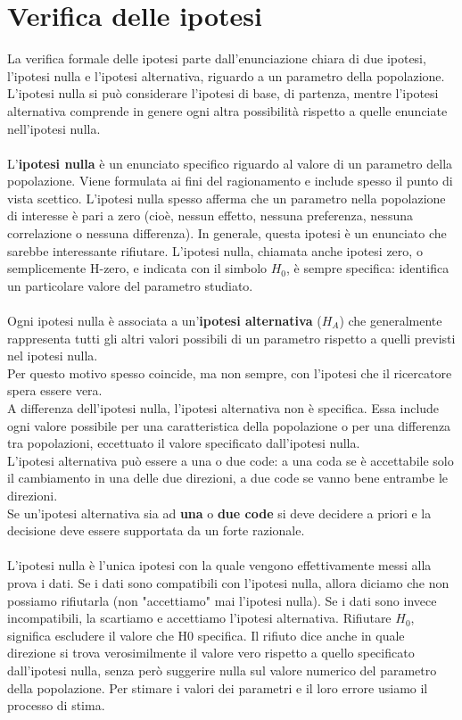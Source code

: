 \documentclass[10pt, draft]{book}
\begin{document}
\section{Verifica delle ipotesi}
La verifica formale delle ipotesi parte dall'enunciazione chiara di due ipotesi, l'ipotesi nulla e l'ipotesi alternativa, riguardo a un parametro della popolazione. L'ipotesi nulla si può considerare l'ipotesi di base, di partenza, mentre l'ipotesi alternativa comprende in genere ogni altra possibilità rispetto a quelle enunciate nell'ipotesi nulla. 
\\
\\
L'\textbf{ipotesi nulla} è un enunciato specifico riguardo al valore di un parametro della popolazione. Viene formulata ai fini del ragionamento e include spesso il punto di vista scettico. L'ipotesi nulla spesso afferma che un parametro nella popolazione di interesse è pari a zero (cioè, nessun effetto, nessuna preferenza, nessuna correlazione o nessuna differenza). In generale, questa ipotesi è un enunciato che sarebbe interessante rifiutare. L'ipotesi nulla, chiamata anche ipotesi zero, o semplicemente H-zero, e indicata con il simbolo $H_0$, è sempre specifica: identifica un particolare valore del parametro studiato. 
\\
\\
Ogni ipotesi nulla è associata a un'\textbf{ipotesi alternativa} ($H_A$) che generalmente rappresenta tutti gli altri valori possibili di un parametro rispetto a quelli previsti nel ipotesi nulla.
\\
Per questo motivo spesso coincide, ma non sempre, con l'ipotesi che il ricercatore spera essere vera.
\\
A differenza dell'ipotesi nulla, l'ipotesi alternativa non è specifica. Essa include ogni valore possibile per una caratteristica della popolazione o per una differenza tra popolazioni, eccettuato il valore specificato dall'ipotesi nulla.
\\
L’ipotesi alternativa può essere a una o due code: a una coda se è accettabile solo il cambiamento in una delle due direzioni, a due code se vanno bene entrambe le direzioni.
\\
Se un’ipotesi alternativa sia ad \textbf{una} o \textbf{due code} si deve decidere a priori e la decisione deve essere supportata da un forte razionale.
\\
\\
L'ipotesi nulla è l'unica ipotesi con la quale vengono effettivamente messi alla prova i dati. Se i dati sono compatibili con l'ipotesi nulla, allora diciamo che non possiamo rifiutarla (non "accettiamo" mai l'ipotesi nulla). Se i dati sono invece incompatibili, la scartiamo e accettiamo l'ipotesi alternativa. Rifiutare $H_0$, significa escludere il valore che H0 specifica. Il rifiuto dice anche in quale direzione si trova verosimilmente il valore vero rispetto a quello specificato dall'ipotesi nulla, senza però suggerire nulla sul valore numerico del parametro della popolazione. Per stimare i valori dei parametri e il loro errore usiamo il processo di stima.
\end{document}

